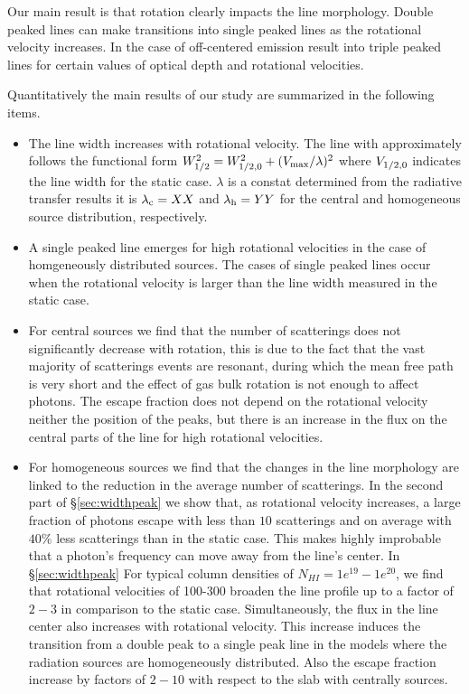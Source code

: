 \documentclass{emulateapj}
\newcommand{\ly}{{\ifmmode{{\rm Ly}\alpha~}\else{Ly$\alpha$~}\fi}}
\newcommand{\kms}{{\ifmmode{{\mathrm{\,km\ s}^{-1}}}\else{\,km~s$^{-1}$}\fi}}
\begin{document}
Our main result is that rotation clearly impacts the \ly line
morphology. Double peaked lines can make transitions into single
peaked lines as the rotational velocity increases. In the case of
off-centered emission result into triple peaked lines for certain
values of optical depth and rotational velocities. 

Quantitatively the main results of our study are summarized in the
following items. 

\begin{itemize}

\item The line width increases with rotational velocity. The line with
  approximately follows the functional form $W_{\rm 1/2}^2 = W_{\rm
    1/2,0}^2 + (V_{\rm max}/\lambda)^2$ where $V_{\rm 1/2,0}$ indicates the line
  width for the static case. $\lambda$ is a constat determined from
  the radiative transfer results it is $\lambda_{\rm c}=XX$ and
  $\lambda_{\rm h}=YY$ for the central and homogeneous source
  distribution, respectively.


\item A single peaked line emerges for high rotational velocities in
  the case of homgeneously distributed sources. The cases of single
  peaked lines occur when the rotational velocity is larger than the
  line width measured in the static case.


\item For central sources we find that the number of scatterings
does not significantly decrease with rotation, this is due to the 
fact that the vast majority of scatterings events are resonant, 
during which the mean free path is very short and the effect of gas
bulk rotation is not enough to affect \ly photons.
The escape fraction does not depend on the rotational velocity neither
the position of the peaks, but there is an increase 
in the flux on the central parts of the line for high rotational 
velocities.

\item For homogeneous sources we find that the changes in the
line morphology are linked to the reduction in the average number of
scatterings. In the second part of \S \ref{sec:widthpeak} we show
that, as rotational velocity increases, a large fraction of photons
escape with less than $10$ scatterings and on average 
with $40\%$ less scatterings than in the static case. This makes highly improbable 
that a photon's frequency can move away from the line's center. 
In \S \ref{sec:widthpeak} For typical column densities of $N_{HI}=1e^{19}-1e^{20}$, 
we find that rotational velocities of 100-300 \kms broaden the line profile up 
to a factor of $2-3$ in comparison to the static case. Simultaneously, the
flux in the line center also increases with rotational velocity. This
increase induces the transition from a double peak to a single peak
line in the models where the radiation sources are homogeneously
distributed. Also the escape fraction increase by factors of $2-10$ with 
respect to the slab with centrally sources.


\end{itemize}
\end{document}
